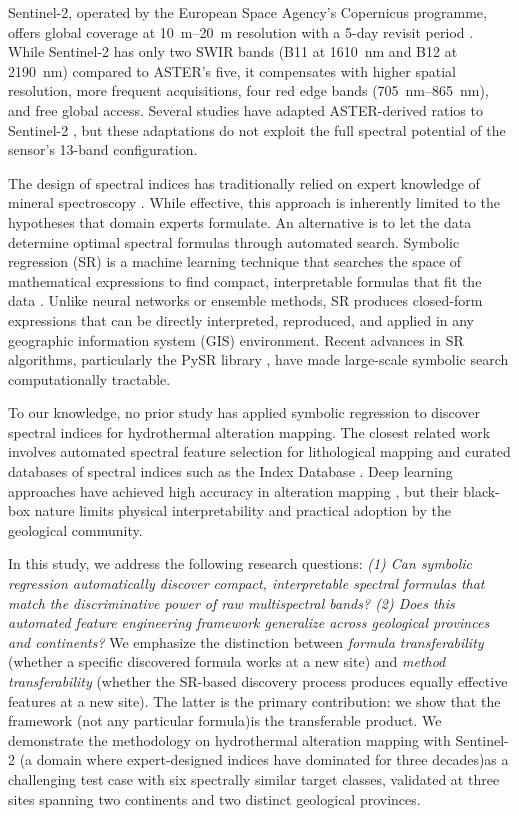 \documentclass[preprint,authoryear,number]{elsarticle}
\begin{document}
Sentinel-2, operated by the European Space Agency's Copernicus programme, offers global coverage at \SIrange{10}{20}{\meter} resolution with a 5-day revisit period \citep{Drusch2012}. While Sentinel-2 has only two SWIR bands (B11 at \SI{1610}{\nano\meter} and B12 at \SI{2190}{\nano\meter}) compared to ASTER's five, it compensates with higher spatial resolution, more frequent acquisitions, four red edge bands (\SIrange{705}{865}{\nano\meter}), and free global access. Several studies have adapted ASTER-derived ratios to Sentinel-2 \citep{vanderWerff2016,Ge2018,Shirmard2022}, but these adaptations do not exploit the full spectral potential of the sensor's 13-band configuration.

The design of spectral indices has traditionally relied on expert knowledge of mineral spectroscopy \citep{Hunt1977,Clark1999}. While effective, this approach is inherently limited to the hypotheses that domain experts formulate. An alternative is to let the data determine optimal spectral formulas through automated search. Symbolic regression (SR) is a machine learning technique that searches the space of mathematical expressions to find compact, interpretable formulas that fit the data \citep{Koza1992,Cranmer2023}. Unlike neural networks or ensemble methods, SR produces closed-form expressions that can be directly interpreted, reproduced, and applied in any geographic information system (GIS) environment. Recent advances in SR algorithms, particularly the PySR library \citep{Cranmer2023}, have made large-scale symbolic search computationally tractable.

To our knowledge, no prior study has applied symbolic regression to discover spectral indices for hydrothermal alteration mapping. The closest related work involves automated spectral feature selection for lithological mapping \citep{Shirmard2022} and curated databases of spectral indices such as the Index Database \citep{Henrich2012}. Deep learning approaches have achieved high accuracy in alteration mapping \citep{Shirmard2022,Ye2017}, but their black-box nature limits physical interpretability and practical adoption by the geological community.

In this study, we address the following research questions: \emph{(1) Can symbolic regression automatically discover compact, interpretable spectral formulas that match the discriminative power of raw multispectral bands? (2) Does this automated feature engineering framework generalize across geological provinces and continents?} We emphasize the distinction between \emph{formula transferability} (whether a specific discovered formula works at a new site) and \emph{method transferability} (whether the SR-based discovery process produces equally effective features at a new site). The latter is the primary contribution: we show that the framework (not any particular formula)is the transferable product. We demonstrate the methodology on hydrothermal alteration mapping with Sentinel-2 (a domain where expert-designed indices have dominated for three decades)as a challenging test case with six spectrally similar target classes, validated at three sites spanning two continents and two distinct geological provinces.
\end{document}
